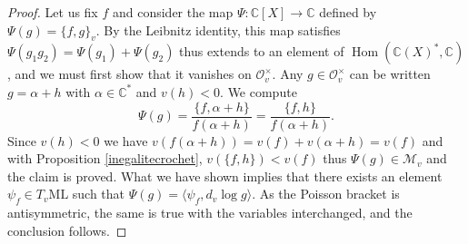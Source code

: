 \documentclass{amsart}
\newcommand{\C}{\mathbb{C}}
\newcommand{\ML}{\mathrm{ML}}
\newcommand{\Mm}{\mathcal{M}}
\newcommand{\Oo}{\mathcal{O}}
\DeclareMathOperator{\Hom}{Hom}
\begin{document}
\begin{proof}
Let us fix $f$ and consider the map $\Psi:\C[X]\to \C$ defined by $\Psi(g)=\{f,g\}_v$. By the Leibnitz identity, this map satisfies $\Psi(g_1g_2)=\Psi(g_1)+\Psi(g_2)$ thus extends to an element of $\Hom(\C(X)^*,\C)$, and we must first show that it vanishes on $\Oo_v^\times$. Any $g\in \Oo_v^\times$ can be written $g=\alpha+h$ with $\alpha\in \C^*$ and $v(h)<0$. We compute 
$$\Psi(g)=\frac{\{f,\alpha+h\}}{f(\alpha+h)}=\frac{\{f,h\}}{f(\alpha+h)}.$$
Since $v(h)<0$ we have $v(f(\alpha+h))=v(f)+v(\alpha+h)=v(f)$ and with Proposition \ref{inegalitecrochet}, $v(\{f,h\})<v(f)$ thus $\Psi(g)\in \Mm_v$ and the claim is proved. 
What we have shown implies that there exists an element $\psi_f\in T_v\ML$ such that $\Psi(g)=\langle \psi_f,d_v \log g\rangle$. As the Poisson bracket is antisymmetric, the same is true with the variables interchanged, and the conclusion follows.
\end{proof}
\end{document}

